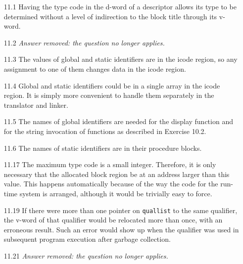 \begin{itemize}
\goodbreak\item[11.1]
Having the type code in the d-word of a descriptor allows its type to be
determined without a level of indirection to the block title through its v-word.

\goodbreak\item[11.2]
{\em Answer removed: the question no longer applies.}

\goodbreak\item[11.3]
The values of global and static identifiers are in the icode region, so any
assignment to one of them changes data in the icode region.

\goodbreak\item[11.4]
Global and static identifiers could be in a single array in the icode region.
It is simply more convenient to handle them separately in the translator
and linker.

\goodbreak\item[11.5]
The names of global identifiers are needed for the display function and for
the string invocation of functions as described in Exercise 10.2.

\goodbreak\item[11.6]
The names of static identifiers are in their procedure blocks.

\goodbreak\item[11.17]
The maximum type code is a small integer. Therefore, it is only necessary
that the allocated block region be at an address larger than this value. This
happens automatically because of the way the code for the run-time system
is arranged, although it would be trivially easy to force.

\goodbreak\item[11.19]
If there were more than one pointer on \texttt{quallist} to the same qualifier, the
v-word of that qualifier would be relocated more than once, with an
erroneous result. Such an error would show up when the qualifier was
used in subsequent program execution after garbage collection.

\goodbreak\item[11.21]
{\em Answer removed: the question no longer applies.}


\end{itemize}
